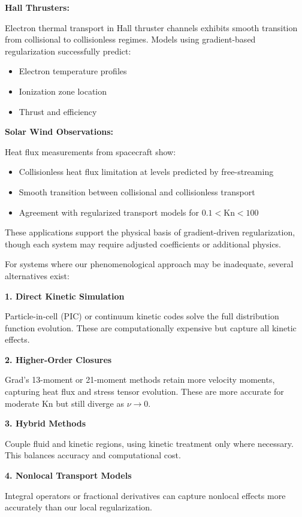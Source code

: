 \documentclass[12pt,a4paper]{article}
\newcommand{\Kn}{\text{Kn}}
\begin{document}
\textbf{Hall Thrusters:}

Electron thermal transport in Hall thruster channels exhibits smooth transition from collisional to collisionless regimes. Models using gradient-based regularization successfully predict:
\begin{itemize}[leftmargin=*]
\item Electron temperature profiles
\item Ionization zone location  
\item Thrust and efficiency
\end{itemize}

\textbf{Solar Wind Observations:}

Heat flux measurements from spacecraft show:
\begin{itemize}[leftmargin=*]
\item Collisionless heat flux limitation at levels predicted by free-streaming
\item Smooth transition between collisional and collisionless transport
\item Agreement with regularized transport models for $0.1 < \Kn < 100$
\end{itemize}

These applications support the physical basis of gradient-driven regularization, though each system may require adjusted coefficients or additional physics.

For systems where our phenomenological approach may be inadequate, several alternatives exist:

\textbf{1. Direct Kinetic Simulation}

Particle-in-cell (PIC) or continuum kinetic codes solve the full distribution function evolution. These are computationally expensive but capture all kinetic effects.

\textbf{2. Higher-Order Closures}

Grad's 13-moment or 21-moment methods retain more velocity moments, capturing heat flux and stress tensor evolution. These are more accurate for moderate $\Kn$ but still diverge as $\nu \to 0$.

\textbf{3. Hybrid Methods}

Couple fluid and kinetic regions, using kinetic treatment only where necessary. This balances accuracy and computational cost.

\textbf{4. Nonlocal Transport Models}

Integral operators or fractional derivatives can capture nonlocal effects more accurately than our local regularization.
\end{document}
